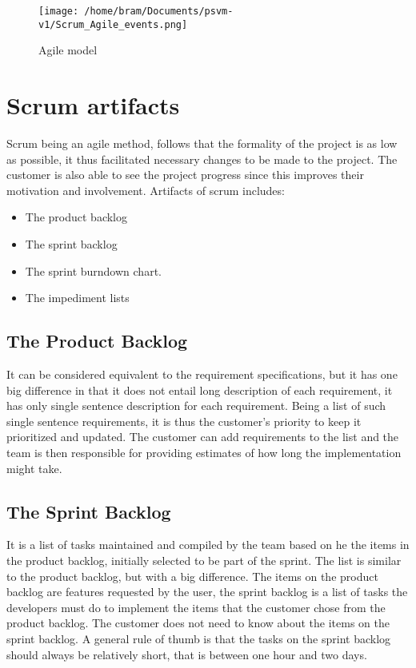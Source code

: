 \documentclass[a4paper, 12pt]{report}
\begin{document}
\begin{figure}[h]
\centering
  \texttt{[image: /home/bram/Documents/psvm-v1/Scrum\_Agile\_events.png]}
  \caption{Agile model }
  \label{fig:agile model}
\end{figure}

\section{Scrum artifacts}
\noindent Scrum being an agile method, follows that the formality of the project is as low as possible, it
thus facilitated necessary changes to be made to the project. The customer is also able to see the
project progress since this improves their motivation and involvement. Artifacts of scrum
includes:
\begin{itemize}
\item The product backlog
\item The sprint backlog
\item The sprint burndown chart.
\item The impediment lists

\end{itemize}
\subsection{The Product Backlog} 
It can be considered equivalent to the requirement specifications, but it has one big difference in
that it does not entail long description of each requirement, it has only single sentence
description for each requirement. Being a list of such single sentence requirements, it is thus the
customer’s priority to keep it prioritized and updated. The customer can add requirements to the
list and the team is then responsible for providing estimates of how long the implementation
might take.

\subsection{The Sprint Backlog} 
It is a list of tasks maintained and compiled by the team based on he the items in the product
backlog, initially selected to be part of the sprint. The list is similar to the product backlog, but
with a big difference. The items on the product backlog are features requested by the user, the
sprint backlog is a list of tasks the developers must do to implement the items that the customer
chose from the product backlog. The customer does not need to know about the items on the
sprint backlog.
A general rule of thumb is that the tasks on the sprint backlog should always be relatively short,
that is between one hour and two days.
\end{document}
